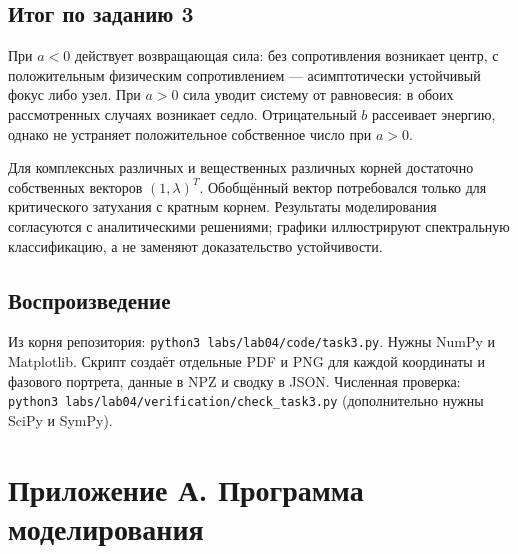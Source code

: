 \documentclass[a4paper,14pt]{extarticle}
\begin{document}
\subsection{Итог по заданию 3}

При $a<0$ действует возвращающая сила: без сопротивления возникает центр, с положительным физическим сопротивлением — асимптотически устойчивый фокус либо узел. При $a>0$ сила уводит систему от равновесия: в обоих рассмотренных случаях возникает седло. Отрицательный $b$ рассеивает энергию, однако не устраняет положительное собственное число при $a>0$.

Для комплексных различных и вещественных различных корней достаточно собственных векторов $(1,\lambda)^T$. Обобщённый вектор потребовался только для критического затухания с кратным корнем. Результаты моделирования согласуются с аналитическими решениями; графики иллюстрируют спектральную классификацию, а не заменяют доказательство устойчивости.

\subsection{Воспроизведение}

Из корня репозитория: \texttt{python3 labs/lab04/code/task3.py}. Нужны NumPy и Matplotlib. Скрипт создаёт отдельные PDF и PNG для каждой координаты и фазового портрета, данные в NPZ и сводку в JSON. Численная проверка: \texttt{python3 labs/lab04/verification/check\_task3.py} (дополнительно нужны SciPy и SymPy).
\clearpage
\section*{Приложение А. Программа моделирования}
\end{document}
